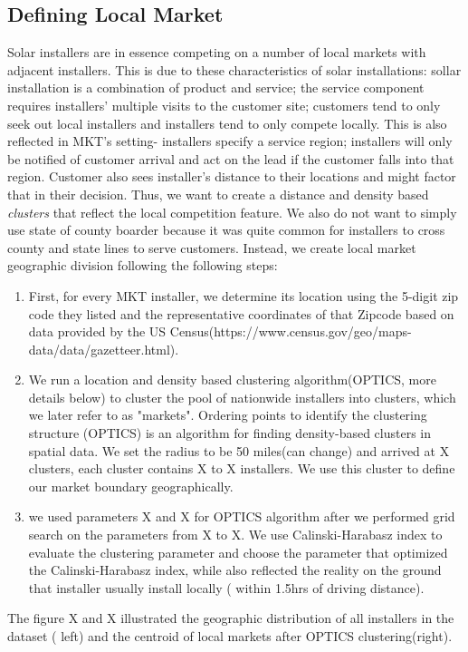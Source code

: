 \documentclass[msom,blindrev]{informs3}
\begin{document}
\subsection{Defining Local Market} 
\label{defiing_local_market}
Solar installers are in essence competing on a number of local markets with adjacent installers.  This is due to these characteristics of solar installations: sollar installation is a combination of product and service; the service component requires installers' multiple visits to the customer site;  customers tend to only seek out local installers and installers tend to only compete locally. This is also reflected in MKT's setting- installers specify a service region; installers will only be notified of customer arrival and act on the lead if the customer falls into that region. Customer also sees installer's distance to their locations and might factor that in their decision. Thus, we want to create a distance and density based \textit{clusters} that reflect the local competition feature. 
We also do not want to simply use state of county boarder because it was quite common for installers to cross county and state lines to serve customers. Instead, we create local market geographic division following the following steps: 
\begin{enumerate}
	\item First, for every MKT installer, we determine its location using the 5-digit zip code they listed and the representative coordinates of that Zipcode based on data provided by the US Census(https://www.census.gov/geo/maps-data/data/gazetteer.html). 
	\item  We run a location and density based clustering algorithm(OPTICS, more details below) to cluster the pool of nationwide installers into clusters, which we later refer to as "markets".  Ordering points to identify the clustering structure (OPTICS) is an algorithm for finding density-based clusters in spatial data.  We set the radius to be 50 miles(can change) and arrived at X clusters, each cluster contains X to X installers. We use this cluster to define our market boundary geographically.   
	\item we used parameters X and X for OPTICS algorithm after we performed grid search on the parameters from X to X. We use Calinski-Harabasz index to evaluate the clustering parameter and choose the parameter that optimized the Calinski-Harabasz index, while also reflected the reality on the ground that installer usually install locally ( within 1.5hrs of driving distance).
\end{enumerate}
The figure X and X illustrated the geographic distribution of all installers in the dataset ( left) and the centroid of local markets after OPTICS clustering(right). 
\end{document}
